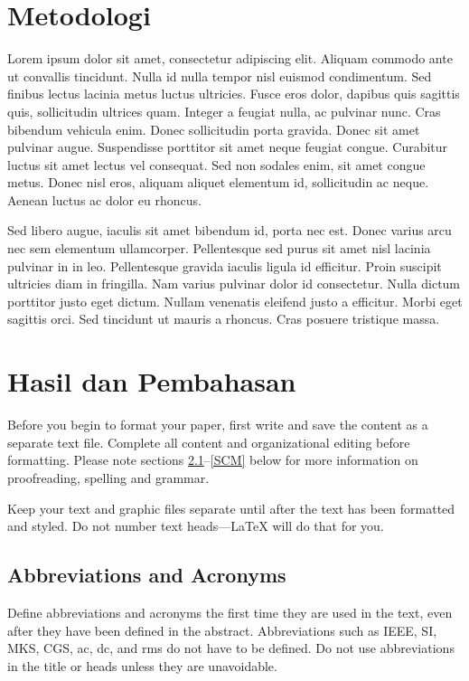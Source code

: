 \documentclass[conference]{IEEEtran}
\begin{document}
\section{Metodologi}
Lorem ipsum dolor sit amet, consectetur adipiscing elit. Aliquam commodo ante ut convallis tincidunt. Nulla id nulla tempor nisl euismod condimentum. Sed finibus lectus lacinia metus luctus ultricies. Fusce eros dolor, dapibus quis sagittis quis, sollicitudin ultrices quam. Integer a feugiat nulla, ac pulvinar nunc. Cras bibendum vehicula enim. Donec sollicitudin porta gravida. Donec sit amet pulvinar augue. Suspendisse porttitor sit amet neque feugiat congue. Curabitur luctus sit amet lectus vel consequat. Sed non sodales enim, sit amet congue metus. Donec nisl eros, aliquam aliquet elementum id, sollicitudin ac neque. Aenean luctus ac dolor eu rhoncus.

Sed libero augue, iaculis sit amet bibendum id, porta nec est. Donec varius arcu nec sem elementum ullamcorper. Pellentesque sed purus sit amet nisl lacinia pulvinar in in leo. Pellentesque gravida iaculis ligula id efficitur. Proin suscipit ultricies diam in fringilla. Nam varius pulvinar dolor id consectetur. Nulla dictum porttitor justo eget dictum. Nullam venenatis eleifend justo a efficitur. Morbi eget sagittis orci. Sed tincidunt ut mauris a rhoncus. Cras posuere tristique massa.

\section{Hasil dan Pembahasan}
Before you begin to format your paper, first write and save the content as a 
separate text file. Complete all content and organizational editing before 
formatting. Please note sections \ref{AA}--\ref{SCM} below for more information on 
proofreading, spelling and grammar.

Keep your text and graphic files separate until after the text has been 
formatted and styled. Do not number text heads---{\LaTeX} will do that 
for you.

\subsection{Abbreviations and Acronyms}\label{AA}
Define abbreviations and acronyms the first time they are used in the text, 
even after they have been defined in the abstract. Abbreviations such as 
IEEE, SI, MKS, CGS, ac, dc, and rms do not have to be defined. Do not use 
abbreviations in the title or heads unless they are unavoidable.
\end{document}
